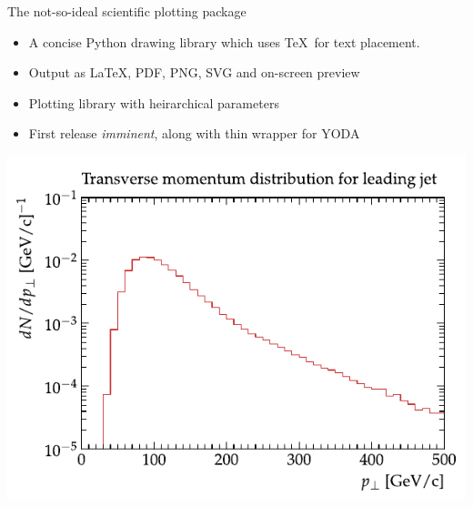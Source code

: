 \documentclass{beamer}
\begin{document}
  \begin{frame}{The not-so-ideal scientific plotting package}
    
    \begin{itemize}
      \item A concise Python drawing library which uses \TeX\ for text placement.
      \item Output as \LaTeX, PDF, PNG, SVG and on-screen preview
      \item Plotting library with heirarchical parameters
      \item First release {\em imminent}, along with thin wrapper for YODA
    \end{itemize}
  \end{frame}
  \begin{frame}
    \includegraphics[width=\textwidth]{daveplot}
  \end{frame}
\end{document}
